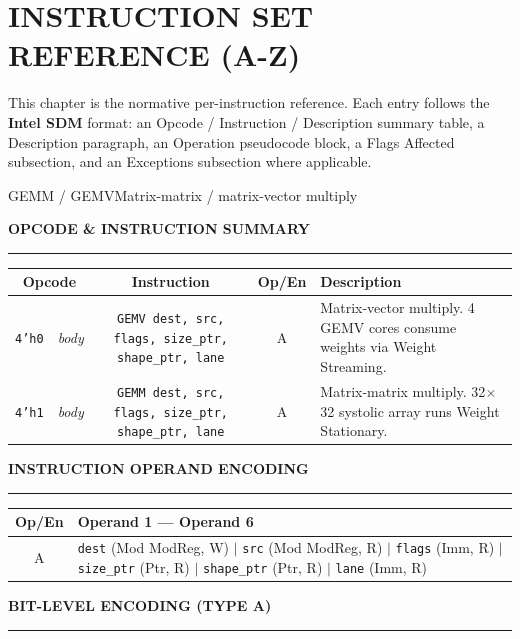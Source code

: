 \documentclass[11pt,a4paper,twoside,openany]{report}
\newcommand{\RefSection}[1]{%
  \par\medskip
  {\sffamily\bfseries\color{oceanblue}\normalsize\MakeUppercase{#1}}
  \par\vspace{-0.4em}
  {\color{oceanblue}\rule{\linewidth}{0.4pt}}\par\smallskip
}
\begin{document}
\newpage

\chapter{INSTRUCTION SET REFERENCE (A-Z)}

This chapter is the normative per-instruction reference. Each entry
follows the \textbf{Intel SDM} format: an Opcode / Instruction /
Description summary table, a Description paragraph, an Operation
pseudocode block, a Flags Affected subsection, and an Exceptions
subsection where applicable.

\begin{InstructionRef}{GEMM / GEMV}{Matrix-matrix / matrix-vector multiply}

\RefSection{Opcode \& Instruction summary}

\begin{tabularx}{\linewidth}{|c|c|c|X|}
\hline
\rowcolor{skytint}
\textbf{Opcode} & \textbf{Instruction} & \textbf{Op/En} & \textbf{Description} \\
\hline
\texttt{4'h0}\ \ \textit{body} & \texttt{GEMV dest, src, flags, size\_ptr, shape\_ptr, lane} & A & Matrix-vector multiply. 4 GEMV cores consume weights via Weight Streaming. \\
\hline
\texttt{4'h1}\ \ \textit{body} & \texttt{GEMM dest, src, flags, size\_ptr, shape\_ptr, lane} & A & Matrix-matrix multiply. 32$\times$32 systolic array runs Weight Stationary. \\
\hline
\end{tabularx}

\RefSection{Instruction operand encoding}

\begin{tabularx}{\linewidth}{|c|X|}
\hline
\rowcolor{skytint}
\textbf{Op/En} & \textbf{Operand 1 --- Operand 6} \\
\hline
A & \texttt{dest} (Mod ModReg, W) $\vert$ \texttt{src} (Mod ModReg, R) $\vert$ \texttt{flags} (Imm, R) $\vert$ \texttt{size\_ptr} (Ptr, R) $\vert$ \texttt{shape\_ptr} (Ptr, R) $\vert$ \texttt{lane} (Imm, R) \\
\hline
\end{tabularx}

\RefSection{Bit-level encoding (Type A)}


\end{InstructionRef}
\end{document}
